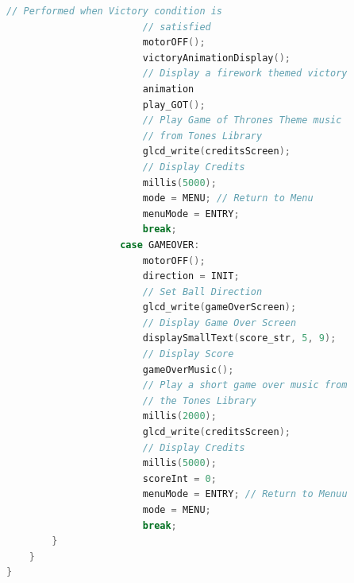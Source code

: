 \documentclass{article}
\begin{document}
\begin{lstlisting}[basicstyle = \small, language = C]
                        // Performed when Victory condition is 
                        // satisfied
                        motorOFF();
                        victoryAnimationDisplay(); 
                        // Display a firework themed victory
                        animation
                        play_GOT(); 
                        // Play Game of Thrones Theme music 
                        // from Tones Library
                        glcd_write(creditsScreen); 
                        // Display Credits
                        millis(5000);
                        mode = MENU; // Return to Menu
                        menuMode = ENTRY;
                        break;
                    case GAMEOVER:
                        motorOFF();
                        direction = INIT; 
                        // Set Ball Direction
                        glcd_write(gameOverScreen); 
                        // Display Game Over Screen
                        displaySmallText(score_str, 5, 9); 
                        // Display Score
                        gameOverMusic(); 
                        // Play a short game over music from 
                        // the Tones Library
                        millis(2000);
                        glcd_write(creditsScreen); 
                        // Display Credits
                        millis(5000);
                        scoreInt = 0;
                        menuMode = ENTRY; // Return to Menuu
                        mode = MENU;
                        break;
        }
    }
}
  \end{lstlisting}
  
\end{document}
